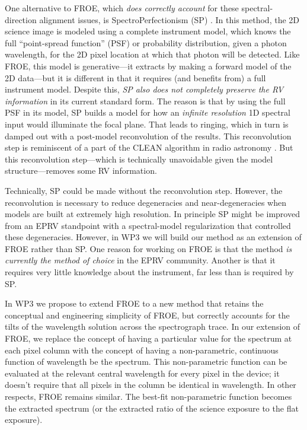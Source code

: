 \documentclass[12pt]{article}
\begin{document}
One alternative to FROE, which \emph{does correctly account} for these spectral-direction alignment issues, is SpectroPerfectionism (SP) \cite{sp}.
In this method, the 2D science image is modeled using a complete instrument model, which knows the full ``point-spread function'' (PSF) or probability distribution, given a photon wavelength, for the 2D pixel location at which that photon will be detected.
Like FROE, this model is generative---it extracts by making a forward model of the 2D data---but it is different in that it requires (and benefits from) a full instrument model.
Despite this, \emph{SP also does not completely preserve the RV information} in its current standard form.
The reason is that by using the full PSF in its model, SP builds a model for how an \emph{infinite resolution} 1D spectral input would illuminate the focal plane.
That leads to ringing, which in turn is damped out with a post-model reconvolution of the results.
This reconvolution step is reminiscent of a part of the CLEAN algorithm in radio astronomy \cite{clean}.
But this reconvolution step---which is technically unavoidable given the model structure---removes some RV information.

Technically, SP could be made without the reconvolution step.
However, the reconvolution is necessary to reduce degeneracies and near-degeneracies when models are built at extremely high resolution.
In principle SP might be improved from an EPRV standpoint with a spectral-model regularization that controlled these degeneracies.
However, in WP3 we will build our method as an extension of FROE rather than SP.
One reason for working on FROE is that the method \emph{is currently the method of choice} in the EPRV community.
Another is that it requires very little knowledge about the instrument, far less than is required by SP.

In WP3 we propose to extend FROE to a new method that retains the conceptual and engineering simplicity of FROE, but correctly accounts for the tilts of the wavelength solution across the spectrograph trace.
In our extension of FROE, we replace the concept of having a particular value for the spectrum at each pixel column with the concept of having a non-parametric, continuous function of wavelength be the spectrum.
This non-parametric function can be evaluated at the relevant central wavelength for every pixel in the device; it doesn't require that all pixels in the column be identical in wavelength.
In other respects, FROE remains similar.
The best-fit non-parametric function becomes the extracted spectrum (or the extracted ratio of the science exposure to the flat exposure).
\end{document}
